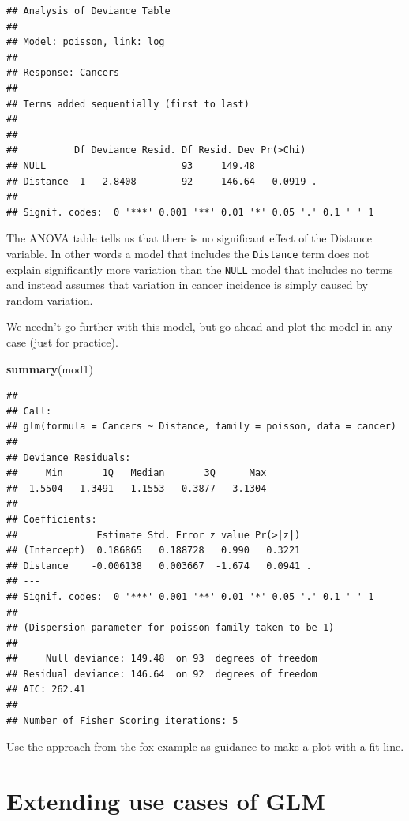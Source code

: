 \documentclass[
  a4paperpaper,
]{book}
\newenvironment{Shaded}{\begin{snugshade}}{\end{snugshade}}
\newcommand{\KeywordTok}[1]{\textcolor[rgb]{0.13,0.29,0.53}{\textbf{#1}}}
\newcommand{\NormalTok}[1]{#1}
\begin{document}
\begin{verbatim}
## Analysis of Deviance Table
## 
## Model: poisson, link: log
## 
## Response: Cancers
## 
## Terms added sequentially (first to last)
## 
## 
##          Df Deviance Resid. Df Resid. Dev Pr(>Chi)  
## NULL                        93     149.48           
## Distance  1   2.8408        92     146.64   0.0919 .
## ---
## Signif. codes:  0 '***' 0.001 '**' 0.01 '*' 0.05 '.' 0.1 ' ' 1
\end{verbatim}

The ANOVA table tells us that there is no significant effect of the Distance variable. In other words a model that includes the \texttt{Distance} term does not explain significantly more variation than the \texttt{NULL} model that includes no terms and instead assumes that variation in cancer incidence is simply caused by random variation.

We needn't go further with this model, but go ahead and plot the model in any case (just for practice).

\begin{Shaded}
\begin{Highlighting}[]
\KeywordTok{summary}\NormalTok{(mod1)}
\end{Highlighting}
\end{Shaded}

\begin{verbatim}
## 
## Call:
## glm(formula = Cancers ~ Distance, family = poisson, data = cancer)
## 
## Deviance Residuals: 
##     Min       1Q   Median       3Q      Max  
## -1.5504  -1.3491  -1.1553   0.3877   3.1304  
## 
## Coefficients:
##              Estimate Std. Error z value Pr(>|z|)  
## (Intercept)  0.186865   0.188728   0.990   0.3221  
## Distance    -0.006138   0.003667  -1.674   0.0941 .
## ---
## Signif. codes:  0 '***' 0.001 '**' 0.01 '*' 0.05 '.' 0.1 ' ' 1
## 
## (Dispersion parameter for poisson family taken to be 1)
## 
##     Null deviance: 149.48  on 93  degrees of freedom
## Residual deviance: 146.64  on 92  degrees of freedom
## AIC: 262.41
## 
## Number of Fisher Scoring iterations: 5
\end{verbatim}

Use the approach from the fox example as guidance to make a plot with a fit line.

\hypertarget{extending-use-cases-of-glm}{%
\chapter{Extending use cases of GLM}\label{extending-use-cases-of-glm}}
\end{document}
